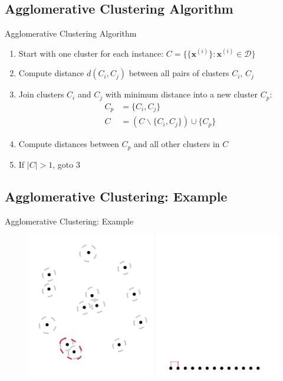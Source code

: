 \subsection{Agglomerative Clustering Algorithm}

\begin{frame}{Agglomerative Clustering Algorithm}{}\important
	\begin{enumerate}
		\item Start with one cluster for each instance: $C = \{ \{ \bm{x}^{(i)}\} : \bm{x}^{(i)} \in \mathcal{D} \}$
		\item Compute distance $d(C_i, C_j)$ between all pairs of clusters $C_i$, $C_j$
		\item Join clusters $C_i$ and $C_j$ with minimum distance into a new cluster $C_p$:
		\begin{align*}
			C_p
				&= \{ C_i, C_j \} \\
			C
				&= (C \backslash \{ C_i, C_j \}) \cup \{ C_p \}
		\end{align*}
		\item Compute distances between $C_p$ and all other clusters in $C$
		\item If $\vert C \vert > 1$, goto 3
	\end{enumerate}
\end{frame}


\subsection{Agglomerative Clustering: Example}

\begin{frame}{Agglomerative Clustering: Example}{}
	\begin{figure}
		\centering
		\includegraphics[scale=0.4]{12_clustering/02_img/aggl_clust_1}
	\end{figure}
\end{frame}


